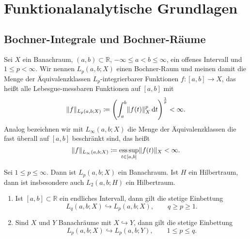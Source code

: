 
\chapter{Funktionalanalytische Grundlagen} %
\label{cha:funktionalanalytische_grundlagen}

\section{Bochner-Integrale und Bochner-Räume} %
\label{sec:bochner_r_ume}

\begin{Definition}
    Sei $X$ ein Banachraum, $(a, b) \subset \mathbb{R}$, $- \infty \leq a < b \leq \infty$, ein offenes Intervall und $1 \leq p < \infty$.
    Wir nennen $L_{p}(a, b; X)$ einen Bochner-Raum und meinen damit die Menge der Äquivalenzklassen $L_{p}$-integrierbarer Funktionen $f \colon [a, b] \to X$, das heißt alle Lebesgue-messbaren Funktionen auf $[a, b]$ mit
    \begin{equation}
        \lVert f\rVert_{L_{p}(a, b; X)} \coloneqq \left( \int_{a}^{b} \lVert f(t)\rVert_{X}^{p} \mathop{}\!\mathrm{d} t \right)^{\frac 1 p} < \infty.
    \end{equation}
    Analog bezeichnen wir mit $L_{\infty}(a, b; X)$ die Menge der Äquivalenzklassen die fast überall auf $[a, b]$ beschränkt sind, das heißt
    \begin{equation}
        \lVert f\rVert_{L_{\infty}(a, b; X)} \coloneqq \operatorname*{ess\,sup}_{t \in [a, b]} \lVert f(t)\rVert_{X} < \infty.
    \end{equation}
\end{Definition}

\begin{Lemma}
    Sei $1 \leq p \leq \infty$. Dann ist $L_{p}(a, b; X)$ ein Banachraum.
    Ist $H$ ein Hilbertraum, dann ist insbesondere auch $L_{2}(a, b; H)$ ein Hilbertraum.
\end{Lemma}

\begin{Lemma}[Eigenschaften]
    \begin{enumerate}
        \item Ist $[a, b] \subset \mathbb{R}$ ein endliches Intervall, dann gilt die stetige Einbettung
        \begin{equation}
            L_{q}(a, b; X) \hookrightarrow L_{p}(a, b; X), \qquad q \geq p \geq 1.
        \end{equation}
        \item Sind $X$ und $Y$ Banachräume mit $X \hookrightarrow Y$, dann gilt die stetige Einbettung
        \begin{equation}
            L_{p}(a, b; X) \hookrightarrow L_{p}(a, b; Y), \qquad 1 \leq p \leq q.
        \end{equation}
    \end{enumerate}
\end{Lemma}
